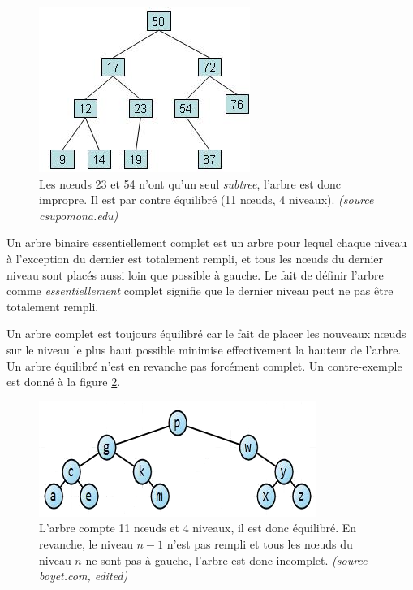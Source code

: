 \documentclass[10pt,a4paper]{article}
\begin{document}
	\begin{figure}[!h]
	\begin{center}
		\includegraphics[scale=.7]{q3-balanced_improper_tree.png}
		\caption{Les nœuds 23 et 54 n'ont qu'un seul \textit{subtree}, l'arbre est donc impropre. Il est par contre équilibré (11 nœuds, 4 niveaux). \textit{(source csupomona.edu)}}
		\label{balanced_improper_tree}
	\end{center}
	\end{figure}
	
	Un arbre binaire essentiellement complet est un arbre pour lequel chaque niveau à l'exception du dernier est totalement rempli, et tous les nœuds du dernier niveau sont placés aussi loin que possible à gauche.
	Le fait de définir l'arbre comme \textit{essentiellement} complet signifie que le dernier niveau peut ne pas être totalement rempli.
	
	Un arbre complet est toujours équilibré car le fait de placer les nouveaux nœuds sur le niveau le plus haut possible minimise effectivement la hauteur de l'arbre.
	Un arbre équilibré n'est en revanche pas forcément complet. Un contre-exemple est donné à la figure \ref{balanced_incomplete_tree}.
	
	\begin{figure}[!h]
	\begin{center}
		\includegraphics[scale=.7]{q3-balanced_incomplete_tree.png}
		\caption{L'arbre compte 11 nœuds et 4 niveaux, il est donc équilibré. En revanche, le niveau $n-1$ n'est pas rempli et tous les nœuds du niveau $n$ ne sont pas à gauche, l'arbre est donc incomplet. \textit{(source boyet.com, edited)}}
		\label{balanced_incomplete_tree}
	\end{center}
	\end{figure}
	
\end{document}
